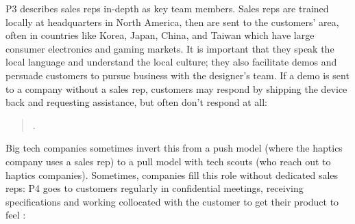 P3 describes sales reps in-depth as key team members.
Sales reps are trained locally at headquarters in North America, then are sent to the customers'
area, often in countries like Korea, Japan, China, and Taiwan which have large consumer electronics and gaming markets.
It is important that they %
speak the local language and understand the local culture; they also facilitate demos and persuade customers to pursue business with the designer's team. %
If a demo is sent to a company without a sales rep, customers may respond by shipping the device back and requesting assistance, but often don't respond at all:

\begin{quote}
.
\end{quote}


Big tech companies sometimes invert this from a push model (where the haptics company uses a sales rep) to a pull model with tech scouts (who reach out to haptics companies).
Sometimes, companies fill this role without dedicated sales reps: P4 goes to customers 
regularly in confidential meetings, receiving specifications and working collocated with the customer to get their product to feel :


